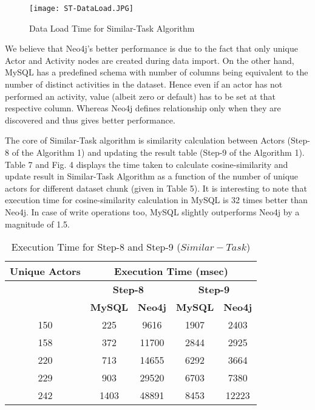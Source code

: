 \documentclass[11pt]{article}
\begin{document}
{{\begin{figure}
\centering
\texttt{[image: ST-DataLoad.JPG]}
\caption{Data Load Time for Similar-Task Algorithm}
\end{figure}
\par{We believe that Neo4j's better performance is due to the fact that only unique Actor and Activity nodes are created during data import. On the other hand, MySQL has a predefined schema with number of columns being equivalent to the number of distinct activities in the dataset. Hence even if an actor has not performed an activity, value (albeit zero or default) has to be set at that respective column. Whereas Neo4j defines relationship only when they are discovered and thus gives better performance.}


\par{The core of Similar-Task algorithm is similarity calculation between Actors (Step-8 of the Algorithm 1) and updating the result table (Step-9 of the Algorithm 1). Table 7 and Fig. 4 displays the time taken to calculate cosine-similarity and update result in Similar-Task Algorithm as a function of the number of unique actors for different dataset chunk (given in Table 5). It is interesting to note that execution time for cosine-similarity calculation in MySQL is 32 times better than Neo4j. In case of write operations too, MySQL slightly outperforms Neo4j by a magnitude of 1.5.}
\renewcommand{\arraystretch}{.5}
\begin{table}[H]
\centering
\caption{\small Execution Time for Step-8 and Step-9 ($Similar-Task$)}
\begin{tabular}{|c|c|c|c|c|}
  \hline
      \textbf{Unique Actors} & \multicolumn{4}{|c|}{\textbf{Execution Time (msec)}}\\
    \hline
    & \multicolumn{2}{|c|}{\textbf{Step-8}} & \multicolumn{2}{|c|}{\textbf{Step-9}}\\ \hline
    & \textbf{MySQL}& \textbf{Neo4j} & \textbf{MySQL}& \textbf{Neo4j}\\ \hline
     150 & 225 & 9616 & 1907 & 2403\\ \hline
     158 & 372 & 11700 & 2844 & 2925\\ \hline
     220 & 713 & 14655 & 6292 & 3664\\ \hline
     229 & 903 & 29520 & 6703 & 7380\\ \hline
     242 & 1403 & 48891 & 8453 & 12223\\ \hline
  \end{tabular}
\end{table}




}}
\end{document}
